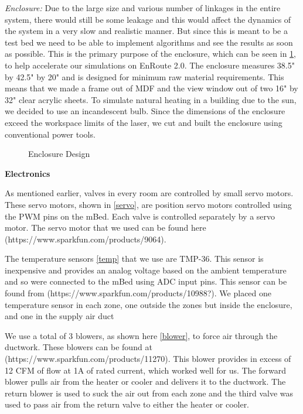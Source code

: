 \documentclass[a4paper,10pt,twocolumn]{article}
\begin{document}
\emph{Enclosure:}
Due to the large size and various number of linkages in the entire system, there would still be some leakage and this would affect the dynamics of the system in a very slow and realistic manner. But since this is meant to be a test bed we need to be able to implement algorithms and see the results as soon as possible. This is the primary purpose of the enclosure, which can be seen in \ref{encl}, to help accelerate our simulations on EnRoute 2.0. The enclosure measures 38.5" by 42.5" by 20" and is designed for minimum raw material requirements. This means that we made a frame out of MDF and the view window out of two 16" by 32" clear acrylic sheets. To simulate natural heating in a building due to the sun, we decided to use an incandescent bulb. Since the dimensions of the enclosure exceed the workspace limits of the laser, we cut and built the enclosure using conventional power tools.

\begin{figure}[t]
\centering
{}
\caption{Enclosure Design}
\label{encl}
\end{figure}

\begin{center}
{\bf Electronics}
\end{center}

As mentioned earlier, valves in every room are controlled by small servo motors. These servo motors, shown in \ref{servo}, are position servo motors controlled using the PWM pins on the mBed. Each valve is controlled separately by a servo motor.  The servo motor that we used can be found here (https://www.sparkfun.com/products/9064).    

The temperature sensors \ref{temp} that we use are TMP-36. This sensor is inexpensive and provides an analog voltage based on the ambient temperature and so were connected to the mBed using ADC input pins. This sensor can be found from (https://www.sparkfun.com/products/10988?).  We placed one temperature sensor in each zone, one outside the zones but inside the enclosure, and one in the supply air duct 

We use a total of 3 blowers, as shown here \ref{blower}, to force air through the ductwork.  These blowers can be found at (https://www.sparkfun.com/products/11270).  This blower provides in excess of 12 CFM of flow at 1A of rated current, which worked well for us.  The forward blower pulls air from the heater or cooler and delivers it to the ductwork. The return blower is used to suck the air out from each zone and the third valve was used to pass air from the return valve to either the heater or cooler.
\end{document}
